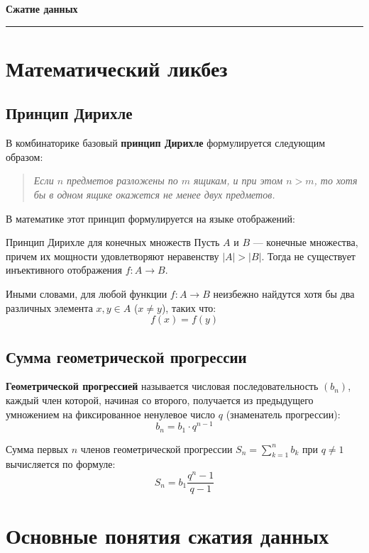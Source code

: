 \documentclass[11pt,a4paper]{article}
\begin{document}
\begin{center}
    {\LARGE \textbf{Сжатие данных}}\\[0.2cm]
    \rule{\textwidth}{1pt}
\end{center}

\section{Математический ликбез}

\subsection{Принцип Дирихле}

В комбинаторике базовый \textbf{принцип Дирихле} формулируется следующим образом:
\begin{quote}
\textit{Если $n$ предметов разложены по $m$ ящикам, и при этом $n > m$, то хотя бы в одном ящике окажется не менее двух предметов.}
\end{quote}

В математике этот принцип формулируется на языке отображений:
\begin{definitionbox}{Принцип Дирихле для конечных множеств}
Пусть $A$ и $B$ --- конечные множества, причем их мощности удовлетворяют неравенству $|A| > |B|$. Тогда не существует инъективного отображения $f\colon A \to B$.

Иными словами, для любой функции $f\colon A \to B$ неизбежно найдутся хотя бы два различных элемента $x, y \in A$ ($x \neq y$), таких что:
$$f(x) = f(y)$$
\end{definitionbox}

\subsection{Сумма геометрической прогрессии}

\textbf{Геометрической прогрессией} называется числовая последовательность $(b_n)$, каждый член которой, начиная со второго, получается из предыдущего умножением на фиксированное ненулевое число $q$ (знаменатель прогрессии):
$$b_n = b_1 \cdot q^{n-1}$$

Сумма первых $n$ членов геометрической прогрессии $S_n = \sum\limits_{k=1}^n b_k$ при $q \neq 1$ вычисляется по формуле:
$$S_n = b_1 \frac{q^n - 1}{q - 1}$$

\section{Основные понятия сжатия данных}
\end{document}
